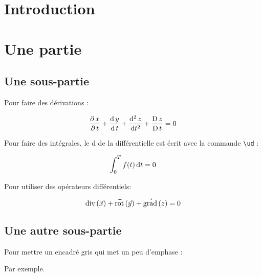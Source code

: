 \documentclass[a4paper,12pt,french]{article}
\begin{document}

\thispagestyle{empty}
\tableofcontents
\pagebreak


\section{Introduction}

\lipsum[1]





\pagebreak
\section{Une partie}
\subsection{Une sous-partie}


Pour faire des dérivations :

\[
    \dfrac{\partial\, x}{\partial\, t} + \dfrac{\mathrm{d}\, y}{\mathrm{d}\, t} + \dfrac{\mathrm{d}^2\, z}{\mathrm{d} t^2} + \dfrac{\mathrm{D}\, z}{\mathrm{D}\, t} = 0
\]



Pour faire des intégrales, le d de la différentielle est écrit avec la commande \texttt{\textbackslash ud} :

\[
    \int_0^T f(t) \, \mathrm{d} t = 0
\]



Pour utiliser des opérateurs différentiels:

\[
    \mathrm{div}\left( \vec{x} \right) + \vec{\mathrm{rot}}\left( \vec{y} \right) + \vec{\mathrm{grad}}\left( z \right) = 0
\]


\subsection{Une autre sous-partie}

Pour mettre un encadré gris qui met un peu d'emphase :

\begin{cadregris}

Par exemple.

\end{cadregris}
\end{document}
